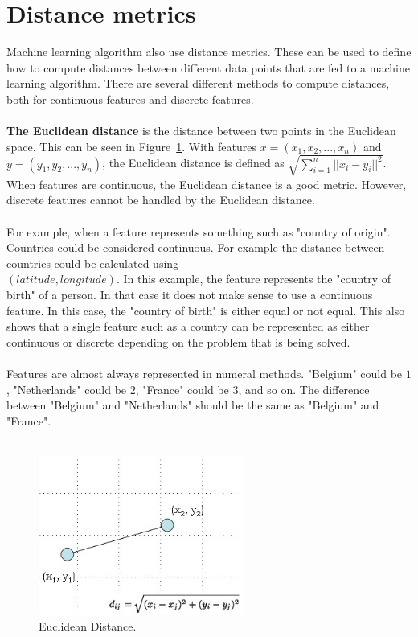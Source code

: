 \section{Distance metrics}
\label{distancemetric}
Machine learning algorithm also use distance metrics. These can be used to define how to compute distances between different data points that are fed to a machine learning algorithm. There are several different methods to compute distances, both for continuous features and discrete features.  \\
\\
\noindent \textbf{The Euclidean distance} is the distance between two points in the Euclidean space. This can be seen in Figure~\ref{fig:euclideanDistance}. With features $x = (x_1, x_2,..., x_n)$ and $y = (y_1, y_2,..., y_n)$, the Euclidean distance is defined as $\sqrt{\sum_{i=1}^{n}||x_i-y_i||^2}$. When features are continuous, the Euclidean distance is a good metric. However, discrete features cannot be handled by the Euclidean distance. \cite{euclideanDistanceExplain} \\
\\
For example, when a feature represents something such as "country of origin". Countries could be considered continuous. For example the distance between countries could be calculated using \\
$(latitude, longitude)$. In this example, the feature represents the "country of birth" of a person. In that case it does not make sense to use a continuous feature. In this case, the "country of birth" is either equal or not equal. This also shows that a single feature such as a country can be represented as either continuous or discrete depending on the problem that is being solved.\\
\\
Features are almost always represented in numeral methods. "Belgium" could be $1$, "Netherlands" could be $2$, "France" could be $3$, and so on. The difference between "Belgium" and "Netherlands" should be the same as "Belgium" and "France".  \\\\

\begin{figure}[H]
\centering
\includegraphics[width=0.6\textwidth]{Figures/euclideanDistance}
\decoRule
\caption[Euclidean Distance]{Euclidean Distance. \cite{euclideanDistance}}
\label{fig:euclideanDistance}
\end{figure}

